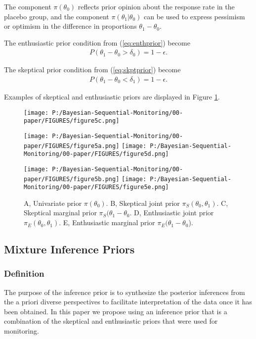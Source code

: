 \documentclass[12pt]{article}
\begin{document}
The component $\pi(\theta_0)$ reflects prior opinion about the response rate in the placebo group, and the component $\pi(\theta_1|\theta_0)$ can be used to express pessimism or optimism in the difference in proportions $\theta_1 - \theta_0$. 

The enthusiastic prior condition from (\ref{eq:enthprior}) become
\begin{align}\label{eq:ex2enthcondition}
P(\theta_1-\theta_0>\delta_0)=1-\epsilon.
\end{align}

The skeptical prior condition from (\ref{eq:skptprior}) become
\begin{align}\label{eq:ex2skptcondition}
P(\theta_1-\theta_0<\delta_1)=1-\epsilon.
\end{align}


Examples of skeptical and enthusiastic priors are displayed in Figure \ref{fig:figure5}.

\begin{figure}
\texttt{[image: P:/Bayesian-Sequential-Monitoring/00-paper/FIGURES/figure5c.png]}

\texttt{[image: P:/Bayesian-Sequential-Monitoring/00-paper/FIGURES/figure5a.png]}
\texttt{[image: P:/Bayesian-Sequential-Monitoring/00-paper/FIGURES/figure5d.png]}

\texttt{[image: P:/Bayesian-Sequential-Monitoring/00-paper/FIGURES/figure5b.png]}
\texttt{[image: P:/Bayesian-Sequential-Monitoring/00-paper/FIGURES/figure5e.png]}
\caption{A, Univariate prior $\pi(\theta_0)$. B, Skeptical joint prior $\pi_S(\theta_0,\theta_1)$. C, Skeptical marginal prior $\pi_S(\theta_1-\theta_0$. D, Enthusiastic joint prior $\pi_E(\theta_0,\theta_1)$. E, Enthusiastic marginal prior $\pi_E(\theta_1-\theta_0$).}
\label{fig:figure5}
 \end{figure}
\subsection{Mixture Inference Priors}
\subsubsection{Definition}
The purpose of the inference prior is to synthesize the posterior inferences from the a priori diverse perspectives to facilitate interpretation of the data once it has been obtained. In this paper we propose using an inference prior that is a combination of the skeptical and enthusiastic priors that were used for monitoring.
\end{document}
